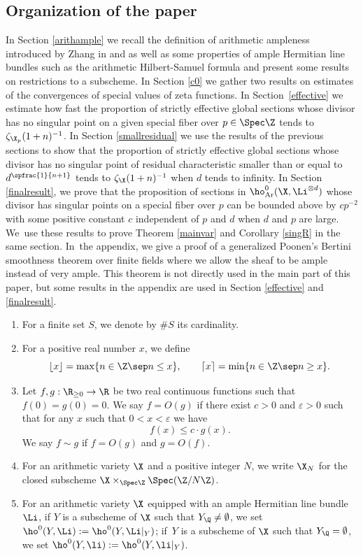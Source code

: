 \subsection{Organization of the paper}
In Section \ref{arithample} we recall the definition of arithmetic ampleness introduced by Zhang in \cite{Zh92} and \cite{Zh95} as well as some properties of ample Hermitian line bundles such as the arithmetic Hilbert-Samuel formula and present some results on restrictions to a subscheme. In Section \ref{c0} we gather two results on estimates of the convergences of special values of zeta functions. In Section~\ref{effective} we estimate how fast the proportion of strictly effective global sections whose divisor has no singular point on a given special fiber over $p\in \Spec \Z$ tends to $\zeta_{\X_p}(1+n)^{-1}$. In Section \ref{smallresidual} we use the results of the previous sections to show that the proportion of strictly effective global sections whose divisor has no singular point of residual characteristic smaller than or equal to $d^{\spfrac{1}{n+1}}$ tends to $\zeta_{\X}(1+n)^{-1}$ when $d$ tends to infinity. In Section \ref{finalresult}, we prove that the proposition of sections in $\ho^0_{\mathrm{Ar}}(\X, \Li^{\otimes d})$ whose divisor has singular points on a special fiber over $p$ can be bounded above by $cp^{-2}$ with some positive constant $c$ independent of $p$ and $d$ when $d$ and $p$ are large. We~use these results to prove Theorem \ref{mainvar} and Corollary \ref{singR} in the same section. In~the appendix, we give a proof of a generalized Poonen's Bertini smoothness theorem over finite fields where we allow the sheaf to be ample instead of very ample. This theorem is not directly used in the main part of this paper, but some results in the appendix are used in Section \ref{effective} and \ref{finalresult}.

\begin{enumerate}
\item For a finite set $S$, we denote by $\#S$ its cardinality.
\item For a positive real number $x$, we define
\[
\lfloor x\rfloor= \max\{ n\in \Z\sep n\leq x \},\qquad
\lceil x\rceil = \min\{ n\in \Z\sep n\geq x \}.
\]
\item Let $f,g: \R_{\geq 0}\to \R$ be two real continuous functions such that $f(0)=g(0)=0$. We say $f=O(g)$ if there exist $c>0$ and $\varepsilon>0$ such that for any $x$ such that $0<x<\varepsilon$ we have
\[
f(x)\leq c\cdot g(x).
\]
We say $f\sim g$ if $f=O(g)$ and $g=O(f)$.
\item For an arithmetic variety $\X$ and a positive integer $N$, we write $\X_N$ for the closed subscheme $\X\times_{\Spec \Z}\Spec(\Z/N\Z)$.
\item For an arithmetic variety $\X$ equipped with an ample Hermitian line bundle~$\Li$, if $Y$ is a subscheme of $\X$ such that $Y_{\Q}\not=\emptyset$, we set $\ho^0(Y,\Li):=\ho^0(Y, \Li|_Y)$; if~$Y$ is a subscheme of $\X$ such that $Y_{\Q}=\emptyset$, we set $\ho^0(Y,\li):=\ho^0(Y, \li|_Y)$.
\end{enumerate}

